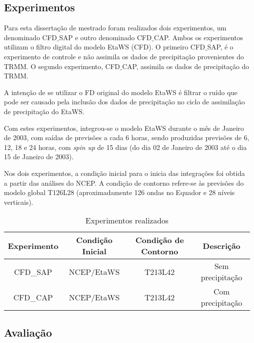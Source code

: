 \subsection{Experimentos}

Para esta dissertação de mestrado foram realizados dois experimentos, um denominado CFD$\_$SAP e outro denominado CFD$\_$CAP. Ambos os experimentos utilizam o filtro digital do modelo EtaWS (CFD). O primeiro CFD$\_$SAP, é o experimento de controle e não assimila os dados de precipitação provenientes do TRMM. O segundo experimento, CFD$\_$CAP, assimila os dados de precipitação do TRMM. 

A intenção de se utilizar o FD original do modelo EtaWS é filtrar o ruído que pode ser causado pela inclusão dos dados de precipitação no ciclo de assimilação de precipitação do EtaWS.

Com estes experimentos, integrou-se o modelo EtaWS durante o mês de Janeiro de 2003, com saídas de previsões a cada 6 horas, sendo produzidas previsões de 6, 12, 18 e 24 horas, com \textit{spin up} de 15 dias (do dia 02 de Janeiro de 2003 até o dia 15 de Janeiro de 2003).

Nos dois experimentos, a condição inicial para o inicia das integrações foi obtida a partir das análises do NCEP. A condição de contorno refere-se às previsões do modelo global T126L28 (aproximadamente 126 ondas no Equador e 28 níveis verticais).

\begin{table}
\caption{Experimentos realizados}
\label{tab04}
\centering
\begin{tabular}{c|c|c|c}
\hline 
Experimento & Condição Inicial & Condição de Contorno & Descrição\tabularnewline
\hline 
CFD\_SAP & NCEP/EtaWS & T213L42 & Sem precipitação\tabularnewline
\hline 
CFD\_CAP & NCEP/EtaWS & T213L42 & Com precipitação\tabularnewline
\hline
\end{tabular}
\end{table}

\subsection{Avaliação}


